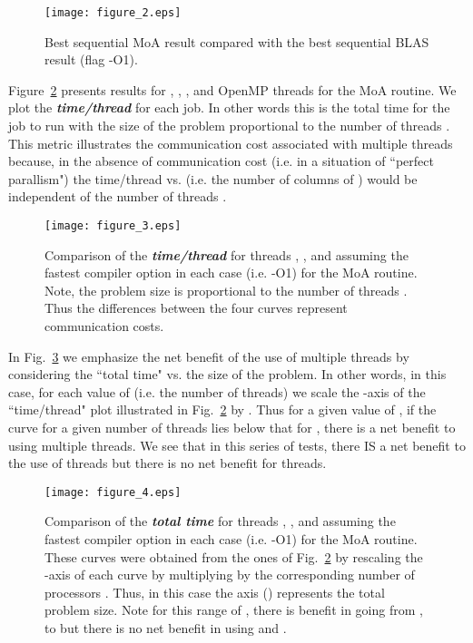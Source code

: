 \documentclass[aps,prl,twocolumn,groupedaddress,floatfix]{revtex4}
\begin{document}
\begin{figure} 
\texttt{[image: figure\_2.eps]}\caption{
\label{fig1} 
Best sequential MoA result compared with the best
sequential BLAS result (flag -O1).}
\end{figure}

Figure~\ref{fig2} presents results for , , , and  OpenMP
threads for the MoA routine.  We plot the {\bf \em time/thread} for 
each job.  In other words this is the total time for the job to
run with the size of the problem proportional to the number of threads .
This metric illustrates the communication cost associated with multiple 
threads because, in the absence of communication cost (i.e. in a situation
of ``perfect parallism") the time/thread vs.  (i.e. the number of 
columns of ) would be independent of the number of threads .

\begin{figure} 
\texttt{[image: figure\_3.eps]}\caption{
\label{fig2} 
Comparison of the {\bf \em time/thread} for 
threads , ,  and  assuming the fastest compiler option in 
each case (i.e. -O1) for the MoA routine.  
Note, the problem size is proportional to the number of threads .  Thus 
the differences between the four curves represent communication costs.}
\end{figure}

In Fig.~\ref{fig3} we emphasize the net benefit of the use of multiple threads
by considering the ``total time" vs. the size of the problem.  In other 
words, in this case, for each value of  (i.e. the number of threads) 
we scale the -axis of the ``time/thread" plot illustrated in 
Fig.~\ref{fig2} by .  
Thus for a given value of , if the curve for a given number of threads
lies below that for , there is a net benefit to using multiple
threads.  We see that in this series of tests, there IS a net benefit to 
the use of  threads but there is no net benefit for  threads.

\begin{figure} 
\texttt{[image: figure\_4.eps]}\caption{
\label{fig3} 
Comparison of the {\bf \em total time} for threads 
, ,  and  assuming the fastest compiler option in each 
case (i.e. -O1) for the MoA routine.   These curves were obtained from the 
ones of Fig.~\ref{fig2} by rescaling the -axis of each curve by 
multiplying by the corresponding number of processors .  Thus, in this 
case the  axis () represents the total problem size.  Note for this 
range of , there is benefit in going from , to  but there is no 
net benefit in using  and .
}
\end{figure}
\end{document}
